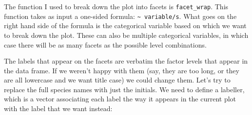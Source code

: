 \documentclass[
]{book}
\begin{document}
The function I used to break down the plot into facets is \texttt{facet\_wrap}. This
function takes as input a one-sided formula: \texttt{\textasciitilde{}\ variable/s}. What goes on the
right hand side of the formula is the categorical variable based on which we
want to break down the plot. These can also be multiple categorical variables,
in which case there will be as many facets as the possible level combinations.

The labels that appear on the facets are verbatim the factor levels that
appear in the data frame. If we weren't happy with them (say, they are too long,
or they are all lowercase and we want title case) we could change them. Let's
try to replace the full species names with just the initials. We need to define
a labeller, which is a vector associating each label the way it appears in the
current plot with the label that we want instead:
\end{document}
